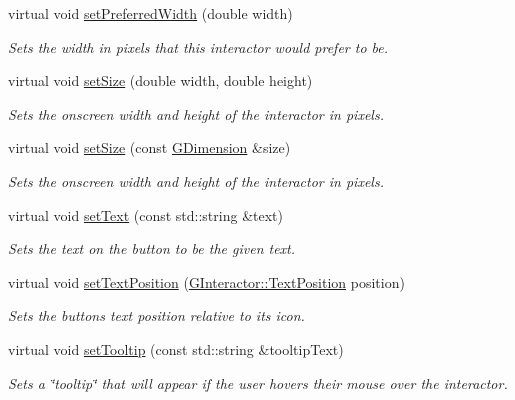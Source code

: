 \begin{DoxyCompactItemize}
virtual void \mbox{\hyperlink{classsgl_1_1GInteractor_a3db429ab2fa52efd187eec0ed8cdd9f2}{set\+Preferred\+Width}} (double width)
\begin{DoxyCompactList}\small\item\em Sets the width in pixels that this interactor would prefer to be. \end{DoxyCompactList}\item 
virtual void \mbox{\hyperlink{classsgl_1_1GInteractor_aca25d49481f9bf5fc8f7df4c086c4ce7}{set\+Size}} (double width, double height)
\begin{DoxyCompactList}\small\item\em Sets the onscreen width and height of the interactor in pixels. \end{DoxyCompactList}\item 
virtual void \mbox{\hyperlink{classsgl_1_1GInteractor_ae2b628228f192c2702c4ce941b2af68f}{set\+Size}} (const \mbox{\hyperlink{structsgl_1_1GDimension}{G\+Dimension}} \&size)
\begin{DoxyCompactList}\small\item\em Sets the onscreen width and height of the interactor in pixels. \end{DoxyCompactList}\item 
virtual void \mbox{\hyperlink{classsgl_1_1GButton_ac1ae51949d41ee9054634be5967d91b8}{set\+Text}} (const std\+::string \&text)
\begin{DoxyCompactList}\small\item\em Sets the text on the button to be the given text. \end{DoxyCompactList}\item 
virtual void \mbox{\hyperlink{classsgl_1_1GButton_af822b8d73c652f7c59d875d7cdfc5302}{set\+Text\+Position}} (\mbox{\hyperlink{classsgl_1_1GInteractor_a8e0d441725a81d2bbdebbea09078260e}{G\+Interactor\+::\+Text\+Position}} position)
\begin{DoxyCompactList}\small\item\em Sets the button\textquotesingle{}s text position relative to its icon. \end{DoxyCompactList}\item 
virtual void \mbox{\hyperlink{classsgl_1_1GInteractor_a039e0e49beaecc275efce02d416acea8}{set\+Tooltip}} (const std\+::string \&tooltip\+Text)
\begin{DoxyCompactList}\small\item\em Sets a \char`\"{}tooltip\char`\"{} that will appear if the user hovers their mouse over the interactor. \end{DoxyCompactList}\item 

\end{DoxyCompactItemize}
